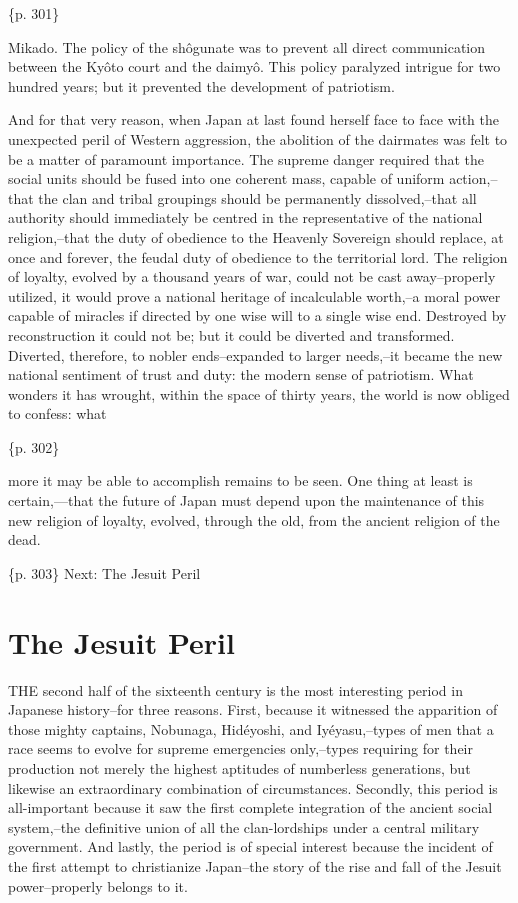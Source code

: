 \{p. 301\}

Mikado. The policy of the shôgunate was to prevent all direct communication between the Kyôto court and the daimyô. This policy paralyzed intrigue for two hundred years; but it prevented the development of patriotism.

And for that very reason, when Japan at last found herself face to face with the unexpected peril of Western aggression, the abolition of the dairmates was felt to be a matter of paramount importance. The supreme danger required that the social units should be fused into one coherent mass, capable of uniform action,--that the clan and tribal groupings should be permanently dissolved,--that all authority should immediately be centred in the representative of the national religion,--that the duty of obedience to the Heavenly Sovereign should replace, at once and forever, the feudal duty of obedience to the territorial lord. The religion of loyalty, evolved by a thousand years of war, could not be cast away--properly utilized, it would prove a national heritage of incalculable worth,--a moral power capable of miracles if directed by one wise will to a single wise end. Destroyed by reconstruction it could not be; but it could be diverted and transformed. Diverted, therefore, to nobler ends--expanded to larger needs,--it became the new national sentiment of trust and duty: the modern sense of patriotism. What wonders it has wrought, within the space of thirty years, the world is now obliged to confess: what

\{p. 302\}

more it may be able to accomplish remains to be seen. One thing at least is certain,---that the future of Japan must depend upon the maintenance of this new religion of loyalty, evolved, through the old, from the ancient religion of the dead.

\{p. 303\}
Next: The Jesuit Peril

\section{The Jesuit Peril}
\label{sec:orgb2c0a5f}

THE second half of the sixteenth century is the most interesting period in Japanese history--for three reasons. First, because it witnessed the apparition of those mighty captains, Nobunaga, Hidéyoshi, and Iyéyasu,--types of men that a race seems to evolve for supreme emergencies only,--types requiring for their production not merely the highest aptitudes of numberless generations, but likewise an extraordinary combination of circumstances. Secondly, this period is all-important because it saw the first complete integration of the ancient social system,--the definitive union of all the clan-lordships under a central military government. And lastly, the period is of special interest because the incident of the first attempt to christianize Japan--the story of the rise and fall of the Jesuit power--properly belongs to it.

